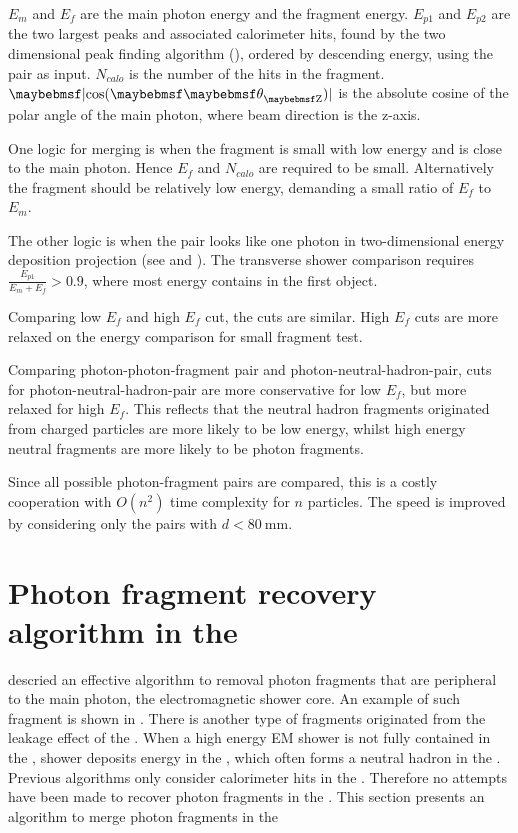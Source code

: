 $E_m$ and $E_f$ are the main photon energy and the fragment energy. $E_{p1}$ and $E_{p2}$ are the two largest peaks and associated calorimeter hits, found by the two dimensional peak finding algorithm (), ordered by descending energy, using the pair as input. $N_{calo}$ is the number of the \ECAL hits in the fragment. $\absCosTheta$ is the absolute cosine of the polar angle of the main photon, where beam direction is the z-axis. 

One logic for merging is when the fragment is small with low energy and is close to the main photon. Hence $E_f$  and $N_{calo}$ are required to be small. Alternatively the fragment should be relatively low energy, demanding a small ratio of $E_f$ to $E_m$.

The other logic is when the pair looks like one photon in two-dimensional energy deposition projection (see  and ). The transverse shower comparison requires $\frac{E_{p1}}{E_m + E_f} > 0.9 $, where most energy contains in the first \ShowerPeak object.

Comparing low $E_f$ and high $E_f$ cut, the cuts are similar. High $E_f$ cuts are more relaxed on the energy comparison for small fragment test.

Comparing photon-photon-fragment pair and photon-neutral-hadron-pair, cuts for photon-neutral-hadron-pair are more conservative for low $E_f$, but more relaxed for high $E_f$. This reflects that the neutral hadron fragments originated from charged particles are more likely to be low energy, whilst high energy neutral fragments are more likely to be photon fragments.

Since all possible photon-fragment pairs are compared, this is a costly cooperation with $O(n^2)$ time complexity for $n$ particles. The speed is improved by considering only the pairs with $d<80\ \text{mm}$.


\section{Photon fragment recovery algorithm in the \HCAL}
\label{sec:photonHighEFragRemoval}

 descried an effective algorithm to removal photon fragments that are peripheral to the main photon, the electromagnetic shower core. An example of such fragment is shown in . There is another type of fragments originated from the leakage effect of the \ECAL. When a high energy EM shower is not fully contained in the \ECAL, shower deposits energy in the \HCAL, which often forms a neutral hadron in the \HCAL. Previous algorithms only consider calorimeter hits in the \ECAL.  Therefore no attempts have been made to recover photon fragments in the \HCAL. This section presents an algorithm to merge photon fragments in the \HCAL


